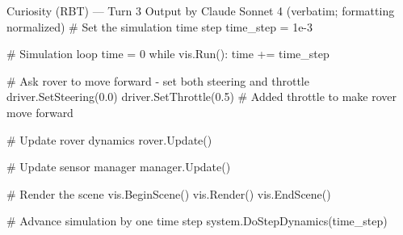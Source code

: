 \begin{CodeBlock}[breakable]{Curiosity (RBT) --- Turn 3 Output by Claude Sonnet 4 (verbatim; formatting normalized)}
      # Set the simulation time step
      time_step = 1e-3
      
      # Simulation loop
      time = 0
      while vis.Run():
          time += time_step
      
          # Ask rover to move forward - set both steering and throttle
          driver.SetSteering(0.0)
          driver.SetThrottle(0.5)  # Added throttle to make rover move forward
      
          # Update rover dynamics
          rover.Update()
      
          # Update sensor manager
          manager.Update()
      
          # Render the scene
          vis.BeginScene()
          vis.Render()
          vis.EndScene()
      
          # Advance simulation by one time step
          system.DoStepDynamics(time_step)
      \end{CodeBlock}
